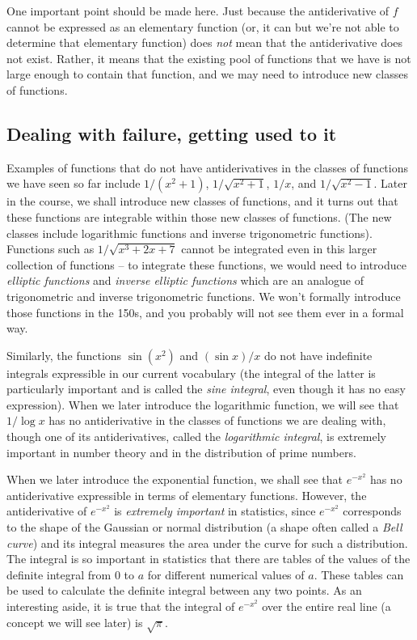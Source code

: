 \documentclass{amsart}
\begin{document}
One important point should be made here. Just because the
antiderivative of $f$ cannot be expressed as an elementary function
(or, it can but we're not able to determine that elementary function)
does {\em not} mean that the antiderivative does not exist. Rather, it
means that the existing pool of functions that we have is not large
enough to contain that function, and we may need to introduce new
classes of functions.

\subsection{Dealing with failure, getting used to it}

Examples of functions that do not have antiderivatives in the classes
of functions we have seen so far include $1/(x^2 + 1)$, $1/\sqrt{x^2 +
1}$, $1/x$, and $1/\sqrt{x^2 - 1}$. Later in the course, we shall
introduce new classes of functions, and it turns out that these
functions are integrable within those new classes of functions. (The
new classes include logarithmic functions and inverse trigonometric
functions). Functions such as $1/\sqrt{x^3 + 2x + 7}$ cannot be
integrated even in this larger collection of functions -- to integrate
these functions, we would need to introduce {\em elliptic functions}
and {\em inverse elliptic functions} which are an analogue of
trigonometric and inverse trigonometric functions. We won't formally
introduce those functions in the 150s, and you probably will not see
them ever in a formal way.

Similarly, the functions $\sin(x^2)$ and $(\sin x)/x$ do not have
indefinite integrals expressible in our current vocabulary (the
integral of the latter is particularly important and is called the
{\em sine integral}, even though it has no easy expression). When we
later introduce the logarithmic function, we will see that $1/\log x$
has no antiderivative in the classes of functions we are dealing with,
though one of its antiderivatives, called the {\em logarithmic
integral}, is extremely important in number theory and in the
distribution of prime numbers.

When we later introduce the exponential function, we shall see that
$e^{-x^2}$ has no antiderivative expressible in terms of elementary
functions. However, the antiderivative of $e^{-x^2}$ is {\em extremely
important} in statistics, since $e^{-x^2}$ corresponds to the shape of
the Gaussian or normal distribution (a shape often called a {\em Bell
curve}) and its integral measures the area under the curve for such a
distribution. The integral is so important in statistics that there
are tables of the values of the definite integral from $0$ to $a$ for
different numerical values of $a$. These tables can be used to
calculate the definite integral between any two points. As an
interesting aside, it is true that the integral of $e^{-x^2}$ over the
entire real line (a concept we will see later) is $\sqrt{\pi}$.
\end{document}
